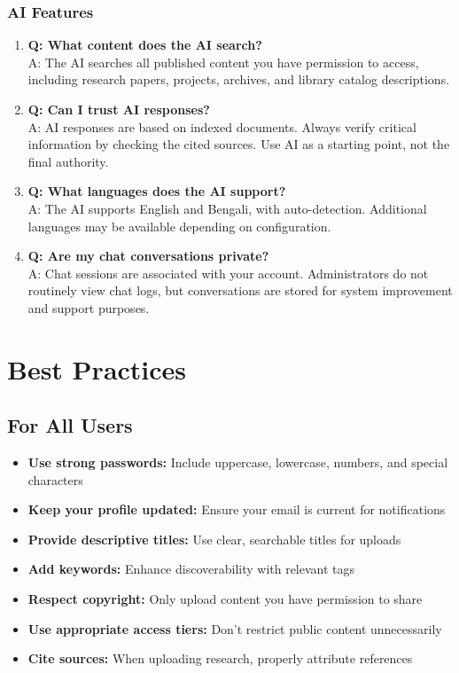 \documentclass[12pt,a4paper]{article}
\begin{document}
\subsubsection{AI Features}
\begin{enumerate}[leftmargin=*]
    \item \textbf{Q: What content does the AI search?}\\
    A: The AI searches all published content you have permission to access, including research papers, projects, archives, and library catalog descriptions.
    
    \item \textbf{Q: Can I trust AI responses?}\\
    A: AI responses are based on indexed documents. Always verify critical information by checking the cited sources. Use AI as a starting point, not the final authority.
    
    \item \textbf{Q: What languages does the AI support?}\\
    A: The AI supports English and Bengali, with auto-detection. Additional languages may be available depending on configuration.
    
    \item \textbf{Q: Are my chat conversations private?}\\
    A: Chat sessions are associated with your account. Administrators do not routinely view chat logs, but conversations are stored for system improvement and support purposes.
\end{enumerate}

\newpage

\section{Best Practices}

\subsection{For All Users}
\begin{itemize}[leftmargin=*]
    \item \textbf{Use strong passwords:} Include uppercase, lowercase, numbers, and special characters
    \item \textbf{Keep your profile updated:} Ensure your email is current for notifications
    \item \textbf{Provide descriptive titles:} Use clear, searchable titles for uploads
    \item \textbf{Add keywords:} Enhance discoverability with relevant tags
    \item \textbf{Respect copyright:} Only upload content you have permission to share
    \item \textbf{Use appropriate access tiers:} Don't restrict public content unnecessarily
    \item \textbf{Cite sources:} When uploading research, properly attribute references
\end{itemize}
\end{document}
